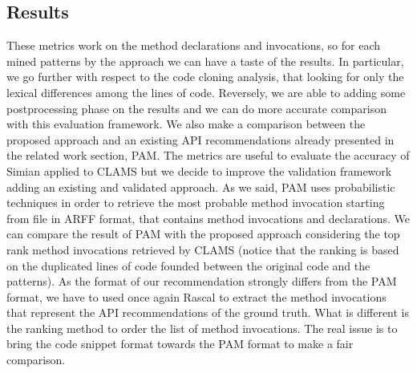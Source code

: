 \subsection{Results}

These metrics work on the method declarations and invocations, so for each mined patterns by the approach we can have a taste of the results. In particular, we go further with respect to the code cloning analysis, that looking for only the lexical differences among the lines of code. Reversely, we are able to adding some postprocessing phase on the results and we can do more accurate comparison with this evaluation framework. 
We also make a comparison between the proposed approach and an existing API recommendations already presented in the related work section, PAM. The metrics are useful to evaluate the accuracy of Simian applied to CLAMS but we decide to improve the validation framework adding an existing and validated approach. As we said, PAM uses probabilistic techniques in order to retrieve the most probable method invocation starting from file in ARFF format, that contains method invocations and declarations. We can compare the result of PAM with the proposed approach considering the top rank method invocations retrieved by CLAMS (notice that the ranking is based on the duplicated lines of code founded between the original code and the patterns). As the format of our recommendation strongly differs from the PAM format, we have to used once again Rascal to extract the method invocations that represent the API recommendations of the ground truth. What is different is the ranking method to order the list of method invocations. The real issue is to bring the code snippet format towards the PAM format to make a fair comparison.\\
